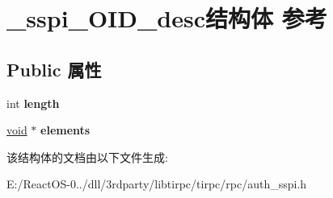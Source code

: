 \hypertarget{struct__sspi___o_i_d__desc}{}\section{\+\_\+sspi\+\_\+\+O\+I\+D\+\_\+desc结构体 参考}
\label{struct__sspi___o_i_d__desc}
\subsection*{Public 属性}
\begin{DoxyCompactItemize}
\item 
\mbox{\label{struct__sspi___o_i_d__desc_af7b5931c9af78544025ddb4485b2205e}} 
int {\bfseries length}
\item 
\mbox{\label{struct__sspi___o_i_d__desc_a3cdaa138eb1ce8a3dc57d27e848b5c05}} 
\hyperlink{interfacevoid}{void} $\ast$ {\bfseries elements}
\end{DoxyCompactItemize}


该结构体的文档由以下文件生成\+:\begin{DoxyCompactItemize}
\item 
E\+:/\+React\+O\+S-\/0../dll/3rdparty/libtirpc/tirpc/rpc/auth\+\_\+sspi.\+h\end{DoxyCompactItemize}
